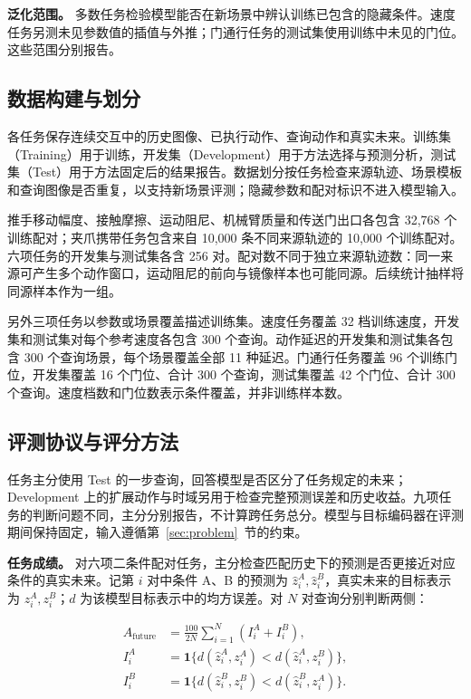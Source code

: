 \documentclass[10pt,twocolumn,letterpaper]{article}
\begin{document}
\textbf{泛化范围。} 多数任务检验模型能否在新场景中辨认训练已包含的隐藏条件。速度任务另测未见参数值的插值与外推；门通行任务的测试集使用训练中未见的门位。这些范围分别报告。

\subsection{数据构建与划分}
\label{sec:data}

各任务保存连续交互中的历史图像、已执行动作、查询动作和真实未来。训练集（Training）用于训练，开发集（Development）用于方法选择与预测分析，测试集（Test）用于方法固定后的结果报告。数据划分按任务检查来源轨迹、场景模板和查询图像是否重复，以支持新场景评测；隐藏参数和配对标识不进入模型输入。

推手移动幅度、接触摩擦、运动阻尼、机械臂质量和传送门出口各包含 32,768 个训练配对；夹爪携带任务包含来自 10,000 条不同来源轨迹的 10,000 个训练配对。六项任务的开发集与测试集各含 256 对。配对数不同于独立来源轨迹数：同一来源可产生多个动作窗口，运动阻尼的前向与镜像样本也可能同源。后续统计抽样将同源样本作为一组。

另外三项任务以参数或场景覆盖描述训练集。速度任务覆盖 32 档训练速度，开发集和测试集对每个参考速度各包含 300 个查询。动作延迟的开发集和测试集各包含 300 个查询场景，每个场景覆盖全部 11 种延迟。门通行任务覆盖 96 个训练门位，开发集覆盖 16 个门位、合计 300 个查询，测试集覆盖 42 个门位、合计 300 个查询。速度档数和门位数表示条件覆盖，并非训练样本数。
\subsection{评测协议与评分方法}
\label{sec:evaluation}

任务主分使用 Test 的一步查询，回答模型是否区分了任务规定的未来；Development 上的扩展动作与时域另用于检查完整预测误差和历史收益。九项任务的判断问题不同，主分分别报告，不计算跨任务总分。模型与目标编码器在评测期间保持固定，输入遵循第~\ref{sec:problem}~节的约束。

\textbf{任务成绩。} 对六项二条件配对任务，主分检查匹配历史下的预测是否更接近对应条件的真实未来。记第 $i$ 对中条件 A、B 的预测为 $\hat z_i^A,\hat z_i^B$，真实未来的目标表示为 $z_i^A,z_i^B$；$d$ 为该模型目标表示中的均方误差。对 $N$ 对查询分别判断两侧：

\begin{equation}
\begin{aligned}
A_{\mathrm{future}}&=\frac{100}{2N}\sum_{i=1}^{N}(I_i^A+I_i^B),\\
I_i^A&=\mathbf 1\{d(\hat z_i^A,z_i^A)<d(\hat z_i^A,z_i^B)\},\\
I_i^B&=\mathbf 1\{d(\hat z_i^B,z_i^B)<d(\hat z_i^B,z_i^A)\}.
\end{aligned}
\label{eq:future-score}
\end{equation}
\end{document}
